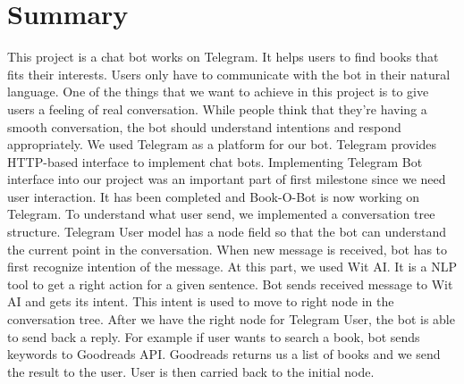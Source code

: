 \documentclass[a4paper]{article}
\begin{document}
\section{Summary}
This project is a chat bot works on Telegram. It helps users to find books that fits their interests.
Users only have to communicate with the bot in their natural language. One of the things that we
want to achieve in this project is to give users a feeling of real conversation. While people think
that they’re having a smooth conversation, the bot should understand intentions and respond
appropriately.
We used Telegram as a platform for our bot. Telegram provides HTTP-based interface to
implement chat bots. Implementing Telegram Bot interface into our project was an important
part of first milestone since we need user interaction. It has been completed and Book-O-Bot is
now working on Telegram.
To understand what user send, we implemented a conversation tree structure. Telegram User
model has a node field so that the bot can understand the current point in the conversation. When
new message is received, bot has to first recognize intention of the message. At this part, we used
Wit AI. It is a NLP tool to get a right action for a given sentence. Bot sends received message to
Wit AI and gets its intent. This intent is used to move to right node in the conversation tree.
After we have the right node for Telegram User, the bot is able to send back a reply. For
example if user wants to search a book, bot sends keywords to Goodreads API.
Goodreads returns us a list of books and we send the result to the user. User is then carried
back to the initial node.
\end{document}
